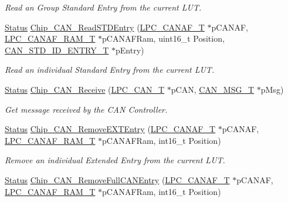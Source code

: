 \begin{DoxyCompactItemize}
\begin{DoxyCompactList}\small\item\em Read an Group Standard Entry from the current L\+UT. \end{DoxyCompactList}\item 
\hyperlink{group__LPC__Types__Public__Types_ga67a0db04d321a74b7e7fcfd3f1a3f70b}{Status} \hyperlink{group__CAN__17XX__40XX_ga0594319bfc5d033b7500a4ca706dc11a}{Chip\+\_\+\+C\+A\+N\+\_\+\+Read\+S\+T\+D\+Entry} (\hyperlink{structLPC__CANAF__T}{L\+P\+C\+\_\+\+C\+A\+N\+A\+F\+\_\+T} $\ast$p\+C\+A\+N\+AF, \hyperlink{structLPC__CANAF__RAM__T}{L\+P\+C\+\_\+\+C\+A\+N\+A\+F\+\_\+\+R\+A\+M\+\_\+T} $\ast$p\+C\+A\+N\+A\+F\+Ram, uint16\+\_\+t Position, \hyperlink{structCAN__STD__ID__ENTRY__T}{C\+A\+N\+\_\+\+S\+T\+D\+\_\+\+I\+D\+\_\+\+E\+N\+T\+R\+Y\+\_\+T} $\ast$p\+Entry)
\begin{DoxyCompactList}\small\item\em Read an individual Standard Entry from the current L\+UT. \end{DoxyCompactList}\item 
\hyperlink{group__LPC__Types__Public__Types_ga67a0db04d321a74b7e7fcfd3f1a3f70b}{Status} \hyperlink{group__CAN__17XX__40XX_gadbb9fadb00c42f7c33f0ed06876a8a03}{Chip\+\_\+\+C\+A\+N\+\_\+\+Receive} (\hyperlink{structLPC__CAN__T}{L\+P\+C\+\_\+\+C\+A\+N\+\_\+T} $\ast$p\+C\+AN, \hyperlink{structCAN__MSG__T}{C\+A\+N\+\_\+\+M\+S\+G\+\_\+T} $\ast$p\+Msg)
\begin{DoxyCompactList}\small\item\em Get message received by the C\+AN Controller. \end{DoxyCompactList}\item 
\hyperlink{group__LPC__Types__Public__Types_ga67a0db04d321a74b7e7fcfd3f1a3f70b}{Status} \hyperlink{group__CAN__17XX__40XX_ga01e3a9942d50effd9da2a773d3af943f}{Chip\+\_\+\+C\+A\+N\+\_\+\+Remove\+E\+X\+T\+Entry} (\hyperlink{structLPC__CANAF__T}{L\+P\+C\+\_\+\+C\+A\+N\+A\+F\+\_\+T} $\ast$p\+C\+A\+N\+AF, \hyperlink{structLPC__CANAF__RAM__T}{L\+P\+C\+\_\+\+C\+A\+N\+A\+F\+\_\+\+R\+A\+M\+\_\+T} $\ast$p\+C\+A\+N\+A\+F\+Ram, int16\+\_\+t Position)
\begin{DoxyCompactList}\small\item\em Remove an individual Extended Entry from the current L\+UT. \end{DoxyCompactList}\item 
\hyperlink{group__LPC__Types__Public__Types_ga67a0db04d321a74b7e7fcfd3f1a3f70b}{Status} \hyperlink{group__CAN__17XX__40XX_ga8d00f1ed0727ec6812ce72d4a194519f}{Chip\+\_\+\+C\+A\+N\+\_\+\+Remove\+Full\+C\+A\+N\+Entry} (\hyperlink{structLPC__CANAF__T}{L\+P\+C\+\_\+\+C\+A\+N\+A\+F\+\_\+T} $\ast$p\+C\+A\+N\+AF, \hyperlink{structLPC__CANAF__RAM__T}{L\+P\+C\+\_\+\+C\+A\+N\+A\+F\+\_\+\+R\+A\+M\+\_\+T} $\ast$p\+C\+A\+N\+A\+F\+Ram, int16\+\_\+t Position)

\end{DoxyCompactItemize}
